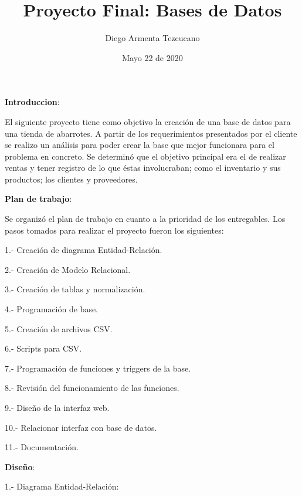\documentclass[12pt, letterpaper]{article}     %
\title{Proyecto Final: Bases de Datos}
\author{Diego Armenta Tezcucano}
\date{Mayo 22 de 2020}
\begin{document}
	\maketitle
	\textbf{Introduccion}:
	
	\vspace{5mm} %
	El siguiente proyecto tiene como objetivo la creación de una base de datos para una tienda de abarrotes. A partir de los requerimientos presentados por el cliente se realizo un análisis para poder crear la base que mejor funcionara para el problema en concreto. Se determinó que el objetivo principal era el de realizar ventas y tener registro de lo que éstas involucraban; como el inventario y sus productos; los clientes y proveedores.
	
	\vspace{5mm} %
	\textbf{Plan de trabajo}:
	
	\vspace{5mm} %
	Se organizó el plan de trabajo en cuanto a la prioridad de los entregables.
	Los pasos tomados para realizar el proyecto fueron los siguientes:
	
	1.- Creación de diagrama Entidad-Relación.
	
	2.- Creación de Modelo Relacional.
	
	3.- Creación de tablas y normalización.
	
	4.- Programación de base.
	
	5.- Creación de archivos CSV.
	
	6.- Scripts para CSV.
	
	7.- Programación de funciones y triggers de la base.
	
	8.- Revisión del funcionamiento de las funciones.
	
	9.- Diseño de la interfaz web.
	
	10.- Relacionar interfaz con base de datos.
	
	11.- Documentación.
	
	\vspace{15mm} %
	\textbf{Diseño}:
	
	\vspace{5mm} %
	1.- Diagrama Entidad-Relación:
	
\end{document}
